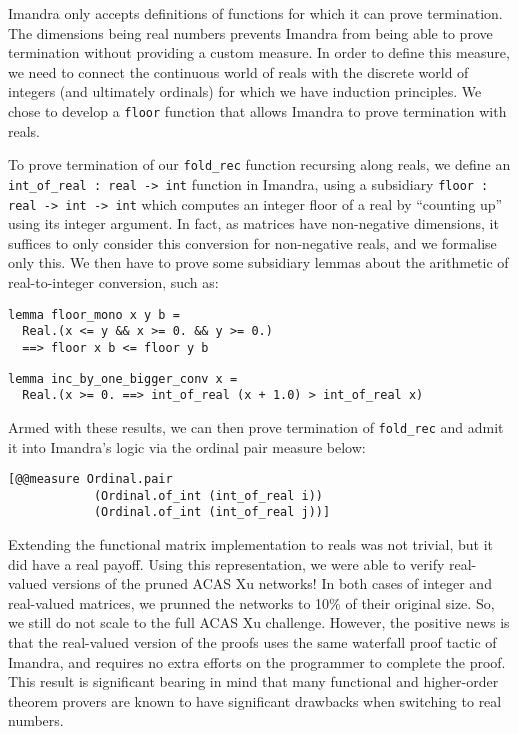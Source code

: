 \documentclass[runningheads]{llncs}
\newcommand{\rnote}[1]{\todo[inline, color=green!20]{#1}}
\begin{document}
\noindent Imandra only accepts definitions of functions for which it can prove termination. The dimensions being real numbers prevents Imandra from being able to prove termination without providing a custom measure. In order to define this measure, we need to connect the continuous world of reals with the discrete world of integers (and ultimately ordinals) for which we have induction principles. We chose to develop a \lstinline{floor} function that allows Imandra to prove termination with reals.


To prove termination of our \lstinline{fold_rec} function recursing along reals, we define an \lstinline{int_of_real : real -> int} function in Imandra, using a subsidiary \lstinline{floor : real -> int -> int} which computes an integer floor of a real by ``counting up'' using its integer argument. In fact, as matrices have non-negative dimensions, it suffices to only consider this conversion for non-negative reals, and we formalise only this. We then have to prove some subsidiary lemmas about the arithmetic of real-to-integer conversion, such as:
%
\begin{lstlisting}[language=caml]
lemma floor_mono x y b =
  Real.(x <= y && x >= 0. && y >= 0.)
  ==> floor x b <= floor y b
\end{lstlisting}

\begin{lstlisting}[language=caml]
lemma inc_by_one_bigger_conv x =
  Real.(x >= 0. ==> int_of_real (x + 1.0) > int_of_real x)
\end{lstlisting}

\noindent Armed with these results, we can then prove termination of \lstinline{fold_rec} and admit it into Imandra's logic via the ordinal pair measure below:
%
\begin{lstlisting}[language=caml]
[@@measure Ordinal.pair
            (Ordinal.of_int (int_of_real i))
            (Ordinal.of_int (int_of_real j))]
\end{lstlisting}

Extending the functional matrix implementation to reals was not trivial, but it did have a real payoff.
Using this representation, we were able to verify real-valued versions of the pruned ACAS Xu networks!
In both cases of integer and real-valued matrices, we prunned the networks to 10\% of their original size.
So, we still do not scale to the full ACAS Xu challenge.  However, the positive news is that the real-valued version
of the proofs
uses the same waterfall proof tactic of Imandra, and requires no extra efforts on the programmer to complete the proof.
This result is significant bearing in mind that many functional and higher-order theorem provers are known to have significant drawbacks when switching to real numbers.
\end{document}
